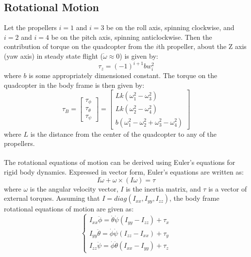 \documentclass{article}
\begin{document}
\subsection{Rotational Motion}
Let the propellers $i=1$ and $i=3$ be on the roll axis, spinning clockwise, and $i=2$ and $i=4$ be on the pitch axis, spinning anticlockwise. Then the contribution of torque on the quadcopter from the $i$th propeller, about the Z axis (yaw axis) in steady state flight ($\dot{\omega}\approx0$) is given by:
\begin{equation}
\tau_z = (-1)^{i+1}bw_i^2
\end{equation}
where $b$ is some appropriately dimensioned constant. The torque on the quadcopter in the body frame is then given by:
\begin{equation}
\label{torque}
\tau_B 	= \begin{bmatrix} \tau_{\phi} \\ \tau_{\theta} \\ \tau_{\psi} \end{bmatrix}
		= \begin{bmatrix} Lk(\omega_1^2 - \omega_3^2) \\ Lk(\omega_2^2-\omega_4^2) \\ b(\omega_1^2-\omega_2^2+\omega_3^2-				\omega_4^2) \end{bmatrix}
\end{equation}
where $L$ is the distance from the center of the quadcopter to any of the propellers. \\\\
The rotational equations of motion can be derived using Euler's equations for rigid body dynamics. Expressed in vector form, Euler's equations are written as:
\begin{equation}
I\dot{\omega}+\omega\times(I\omega) = \tau
\end{equation}
where $\omega$ is the angular velocity vector, $I$ is the inertia matrix, and $\tau$ is a vector of external torques. Assuming that $I = diag(I_{xx}, I_{yy}, I_{zz})$, the body frame rotational equations of motion are given as:
\begin{equation}
\label{rotation}
\left\{
\begin{array}{rl}
I_{xx}\ddot{\phi}=\dot{\theta}\dot{\psi}(I_{yy}-I_{zz})+\tau_x\\
I_{yy}\ddot{\theta}=\dot{\phi}\dot{\psi}(I_{zz}-I_{xx})+\tau_y\\
I_{zz}\ddot{\psi}=\dot{\phi}\dot{\theta}(I_{xx}-I_{yy})+\tau_z
\end{array}
\right.
\end{equation} 
\end{document}
